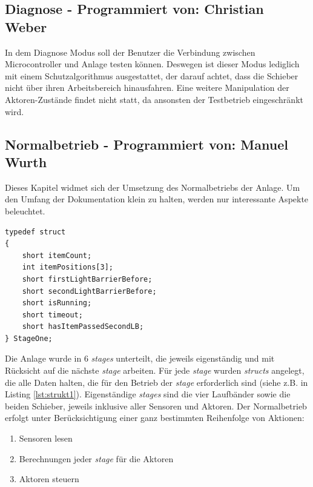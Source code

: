 \documentclass[fontsize=11pt,a4paper,final]{scrartcl}[2003/01/01]
\newcommand*{\manu}{%
	Programmiert von: Manuel Wurth
}
\newcommand*{\chris}{%
	Programmiert von: Christian Weber
}
\begin{document}
\subsection{Diagnose - \chris}
In dem Diagnose Modus soll der Benutzer die Verbindung zwischen Microcontroller und Anlage testen können. Deswegen ist dieser Modus lediglich mit einem Schutzalgorithmus ausgestattet, der darauf achtet, dass die Schieber nicht über ihren Arbeitsbereich hinausfahren. Eine weitere Manipulation der Aktoren-Zustände findet nicht statt, da ansonsten der Testbetrieb eingeschränkt wird.

\subsection{Normalbetrieb - \manu}
Dieses Kapitel widmet sich der Umsetzung des Normalbetriebs der Anlage. Um den Umfang der Dokumentation klein zu halten, werden nur interessante Aspekte beleuchtet.
\begin{lstlisting}[caption={Beispiel: Struct für die erste \textit{stage} (erstes Laufband)},label={lst:strukt1}]
typedef struct
{
	short itemCount;
	int itemPositions[3];
	short firstLightBarrierBefore;
	short secondLightBarrierBefore;
	short isRunning;
	short timeout;
	short hasItemPassedSecondLB;
} StageOne;
\end{lstlisting} 
Die Anlage wurde in 6 \textit{stages} unterteilt, die jeweils eigenständig und mit Rücksicht auf die nächste \textit{stage} arbeiten. Für jede \textit{stage} wurden \textit{structs} angelegt, die alle Daten halten, die für den Betrieb der \textit{stage} erforderlich sind (siehe z.B. in Listing \ref{lst:strukt1}). Eigenständige \textit{stages} sind die vier Laufbänder sowie die beiden Schieber, jeweils inklusive aller Sensoren und Aktoren. Der Normalbetrieb erfolgt unter Berücksichtigung einer ganz bestimmten Reihenfolge von Aktionen:
\begin{enumerate}
\item Sensoren lesen
\item Berechnungen jeder \textit{stage} für die Aktoren
\item Aktoren steuern
\end{enumerate}
\end{document}
